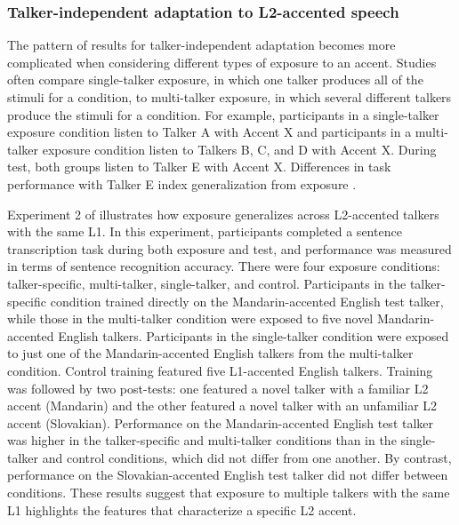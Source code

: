 \documentclass[preprint, 3p, authoryear]{elsarticle} %
\begin{document}
\hypertarget{talker-independent-adaptation-to-l2-accented-speech}{%
\subsubsection{Talker-independent adaptation to L2-accented speech}\label{talker-independent-adaptation-to-l2-accented-speech}}

The pattern of results for talker-independent adaptation becomes more complicated when considering different types of exposure to an accent.
Studies often compare single-talker exposure, in which one talker produces all of the stimuli for a condition, to multi-talker exposure, in which several different talkers produce the stimuli for a condition.
For example, participants in a single-talker exposure condition listen to Talker A with Accent X and participants in a multi-talker exposure condition listen to Talkers B, C, and D with Accent X.
During test, both groups listen to Talker E with Accent X.
Differences in task performance with Talker E index generalization from exposure \citep{baese2013, bradlow2008, xie2017similarity, xie2021}.

Experiment 2 of \citet{bradlow2008} illustrates how exposure generalizes across L2-accented talkers with the same L1.
In this experiment, participants completed a sentence transcription task during both exposure and test, and performance was measured in terms of sentence recognition accuracy.
There were four exposure conditions: talker-specific, multi-talker, single-talker, and control.
Participants in the talker-specific condition trained directly on the Mandarin-accented English test talker, while those in the multi-talker condition were exposed to five novel Mandarin-accented English talkers.
Participants in the single-talker condition were exposed to just one of the Mandarin-accented English talkers from the multi-talker condition.
Control training featured five L1-accented English talkers.
Training was followed by two post-tests: one featured a novel talker with a familiar L2 accent (Mandarin) and the other featured a novel talker with an unfamiliar L2 accent (Slovakian).
Performance on the Mandarin-accented English test talker was higher in the talker-specific and multi-talker conditions than in the single-talker and control conditions, which did not differ from one another.
By contrast, performance on the Slovakian-accented English test talker did not differ between conditions.
These results suggest that exposure to multiple talkers with the same L1 highlights the features that characterize a specific L2 accent.
\end{document}
